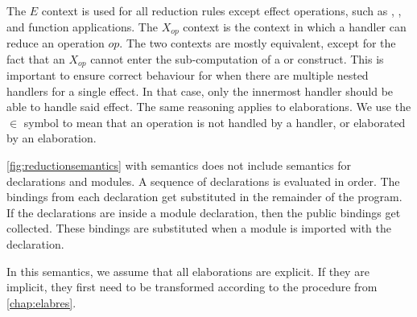 The $E$ context is used for all reduction rules except effect operations, such as , , and function applications. The $X_{op}$ context is the context in which a handler can reduce an operation $op$. The two contexts are mostly equivalent, except for the fact that an $X_{op}$ cannot enter the sub-computation of a  or  construct. This is important to ensure correct behaviour for when there are multiple nested handlers for a single effect. In that case, only the innermost handler should be able to handle said effect. The same reasoning applies to elaborations. We use the $\in$ symbol to mean that an operation is not handled by a handler, or elaborated by an elaboration.

\cref{fig:reductionsemantics} with semantics does not include semantics for declarations and modules. A sequence of declarations is evaluated in order. The bindings from each declaration get substituted in the remainder of the program. If the declarations are inside a module declaration, then the public bindings get collected. These bindings are substituted when a module is imported with the  declaration.

In this semantics, we assume that all elaborations are explicit. If they are implicit, they first need to be transformed according to the procedure from \cref{chap:elabres}.

